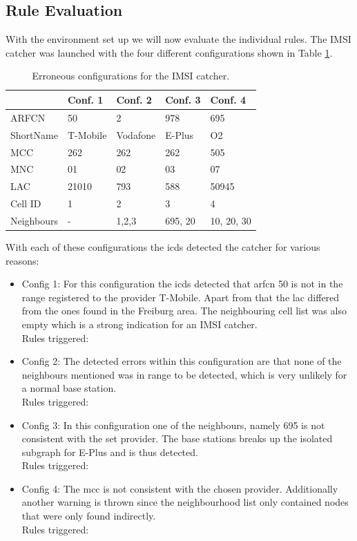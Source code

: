 \subsection{Rule Evaluation}
With the environment set up we will now evaluate the individual rules.
The IMSI catcher was launched with the four different configurations shown in Table \ref{tab:err_configs}.
\begin{table}
\centering
\begin{tabular}{lllll}
\toprule
			&Conf. 1		&Conf. 2		&Conf. 3		&Conf. 4\\
\midrule
ARFCN		&50				&2				&978			&695	\\
ShortName	&T-Mobile		&Vodafone		&E-Plus			&O2		\\
MCC			&262			&262			&262			&505	\\
MNC			&01				&02				&03				&07		\\
LAC			&21010			&793			&588			&50945	\\
Cell ID		&1				&2				&3				&4		\\
Neighbours	&-				&1,2,3			&695, 20		&10, 20, 30\\
\bottomrule
\end{tabular}
\caption{Erroneous configurations for the IMSI catcher.}
\label{tab:err_configs}
\end{table}
With each of these configurations the \gls{icds} detected the catcher for various reasons:
\begin{itemize}
	\item Config 1: For this configuration the \gls{icds} detected that \gls{arfcn} 50 is not in the range registered to the provider T-Mobile.
	Apart from that the \gls{lac} differed from the ones found in the Freiburg area.
	The neighbouring cell list was also empty which is a strong indication for an IMSI catcher.\\
	Rules triggered:  
	\item Config 2: The detected errors within this configuration are that none of the neighbours mentioned was in range to be detected, which is very unlikely for a normal base station.\\
	Rules triggered:
	\item Config 3: In this configuration one of the neighbours, namely 695 is not consistent with the set provider.
	The base stations breaks up the isolated subgraph for E-Plus and is thus detected.\\
	Rules triggered:
	\item Config 4: The \gls{mcc} is not consistent with the chosen provider. 
	Additionally another warning is thrown since the neighbourhood list only contained nodes that were only found indirectly.\\
	Rules triggered:
\end{itemize}
